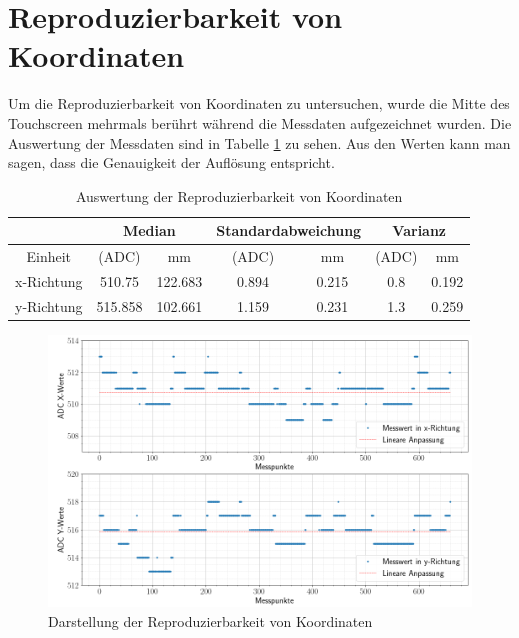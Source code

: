 \section{Reproduzierbarkeit von Koordinaten}
\label{ab:wiederholung}
Um die Reproduzierbarkeit von Koordinaten zu untersuchen, wurde die Mitte des Touchscreen mehrmals berührt während die Messdaten aufgezeichnet wurden.
Die Auswertung der Messdaten sind in Tabelle \cref{tab:wiederholung} zu sehen.
Aus den Werten kann man sagen, dass die Genauigkeit der Auflösung entspricht.
\begin{table}[ht!]
    \caption{Auswertung der Reproduzierbarkeit von Koordinaten}
    \begin{center}
        \begin{tabular}{ |c|c|c|c|c|c|c| }
          \hline  
         &\multicolumn{2}{c|}{Median}& \multicolumn{2}{c|}{Standardabweichung}&\multicolumn{2}{c|}{Varianz} \\ \hline
         Einheit    &(ADC)              &mm             &(ADC)          &mm             &(ADC)          &mm\\\hline
         x-Richtung & \SI{510,75}{}    & \SI{122,683}{}&\SI{0,894}{}   &\SI{0,215}{}   &\SI{0,8}{}     & \SI{0,192}{} \\  \hline
         y-Richtung & \SI{515,858}{}    & \SI{102,661}{}&\SI{1,159}{}   &\SI{0,231}{}   &\SI{1,3}{}     & \SI{0,259}{} \\ \hline  
        \end{tabular}
        \label{tab:wiederholung}
    \end{center}   
\end{table}


\begin{figure}[ht!]
    \centering
    \includegraphics[width=\linewidth]{fig/wiederholung.png}
    \caption{Darstellung der Reproduzierbarkeit von Koordinaten}
    \label{fig:wiederholung}
\end{figure}
